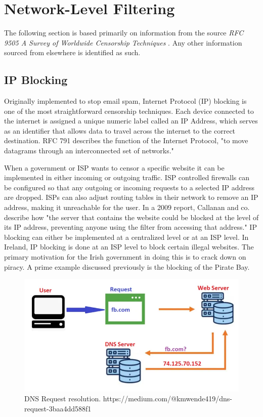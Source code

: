 \section{Network-Level Filtering}
The following section is based primarily on information from the source \textit{RFC 9505 A Survey of Worldwide Censorship Techniques} \cite{rfc9505}. Any other information sourced from elsewhere is identified as such.

\subsection{IP Blocking}
Originally implemented to stop email spam, Internet Protocol (IP) blocking is one of the most straightforward censorship techniques. Each device connected to the internet is assigned a unique numeric label called an IP Address, which serves as an identifier that allows data to travel across the internet to the correct destination. RFC 791 describes the function of the Internet Protocol, "to move datagrams through an interconnected set of networks." \cite{rfc791}

When a government or ISP wants to censor a specific website it can be implemented in either incoming or outgoing traffic. ISP controlled firewalls can be configured so that any outgoing or incoming requests to a selected IP address are dropped. ISPs can also adjust routing tables in their network to remove an IP address, making it unreachable for the user. In a 2009 report, Callanan and co. describe how "the server that contains the website could be blocked at the level of its IP address, preventing anyone using the filter from accessing that address." \cite{inthemis2025internet} IP blocking can either be implemented at a centralized level or at an ISP level. In Ireland, IP blocking is done at an ISP level to block certain illegal websites. The primary motivation for the Irish government in doing this is to crack down on piracy. A prime example discussed previously is the blocking of the Pirate Bay. \cite{piratebay_block2013}

\begin{figure} [H]
    \centering
    \includegraphics[width=1\linewidth]{DNSimg.png}
    \caption{DNS Request resolution. https://medium.com/@kmwende419/dns-request-3baa4dd588f1}
    \label{fig:enter-label}
\end{figure}


